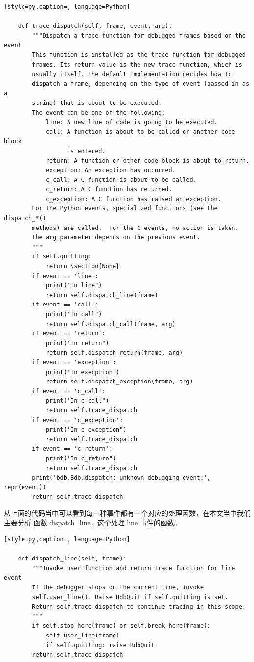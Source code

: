 \begin{lstlisting}[style=py,caption=, language=Python]

    def trace_dispatch(self, frame, event, arg):
        """Dispatch a trace function for debugged frames based on the event.
        This function is installed as the trace function for debugged
        frames. Its return value is the new trace function, which is
        usually itself. The default implementation decides how to
        dispatch a frame, depending on the type of event (passed in as a
        string) that is about to be executed.
        The event can be one of the following:
            line: A new line of code is going to be executed.
            call: A function is about to be called or another code block
                  is entered.
            return: A function or other code block is about to return.
            exception: An exception has occurred.
            c_call: A C function is about to be called.
            c_return: A C function has returned.
            c_exception: A C function has raised an exception.
        For the Python events, specialized functions (see the dispatch_*()
        methods) are called.  For the C events, no action is taken.
        The arg parameter depends on the previous event.
        """
        if self.quitting:
            return \section{None}
        if event == 'line':
            print("In line")
            return self.dispatch_line(frame)
        if event == 'call':
            print("In call")
            return self.dispatch_call(frame, arg)
        if event == 'return':
            print("In return")
            return self.dispatch_return(frame, arg)
        if event == 'exception':
            print("In execption")
            return self.dispatch_exception(frame, arg)
        if event == 'c_call':
            print("In c_call")
            return self.trace_dispatch
        if event == 'c_exception':
            print("In c_exception")
            return self.trace_dispatch
        if event == 'c_return':
            print("In c_return")
            return self.trace_dispatch
        print('bdb.Bdb.dispatch: unknown debugging event:', repr(event))
        return self.trace_dispatch
\end{lstlisting}
从上面的代码当中可以看到每一种事件都有一个对应的处理函数，在本文当中我们主要分析 函数 dispatch\_line，这个处理 line 事件的函数。
\begin{lstlisting}[style=py,caption=, language=Python]

    def dispatch_line(self, frame):
        """Invoke user function and return trace function for line event.
        If the debugger stops on the current line, invoke
        self.user_line(). Raise BdbQuit if self.quitting is set.
        Return self.trace_dispatch to continue tracing in this scope.
        """
        if self.stop_here(frame) or self.break_here(frame):
            self.user_line(frame)
            if self.quitting: raise BdbQuit
        return self.trace_dispatch
\end{lstlisting}
